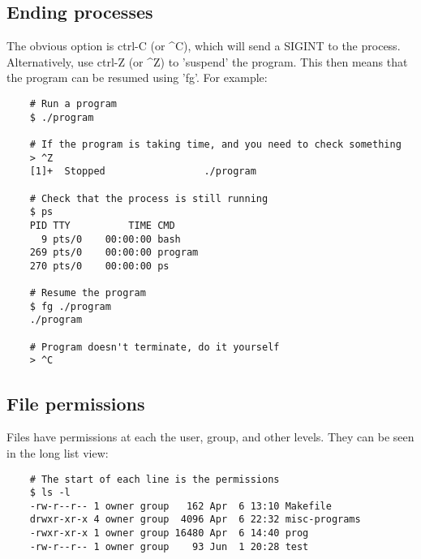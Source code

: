 \documentclass{article}
\begin{document}
\subsection{Ending processes}

The obvious option is ctrl-C (or \^{}C), which will send a SIGINT to the process. Alternatively, use ctrl-Z (or \^{}Z) to 'suspend' the program. This then means that the program can be resumed using 'fg'. For example:

\begin{verbatim}
    # Run a program
    $ ./program

    # If the program is taking time, and you need to check something
    > ^Z
    [1]+  Stopped                 ./program

    # Check that the process is still running
    $ ps
    PID TTY          TIME CMD
      9 pts/0    00:00:00 bash
    269 pts/0    00:00:00 program
    270 pts/0    00:00:00 ps

    # Resume the program
    $ fg ./program
    ./program

    # Program doesn't terminate, do it yourself
    > ^C
\end{verbatim}

\subsection{File permissions}
Files have permissions at each the user, group, and other levels. They can be seen in the long list view:
\begin{verbatim}
    # The start of each line is the permissions
    $ ls -l
    -rw-r--r-- 1 owner group   162 Apr  6 13:10 Makefile
    drwxr-xr-x 4 owner group  4096 Apr  6 22:32 misc-programs
    -rwxr-xr-x 1 owner group 16480 Apr  6 14:40 prog
    -rw-r--r-- 1 owner group    93 Jun  1 20:28 test
\end{verbatim}
\end{document}
